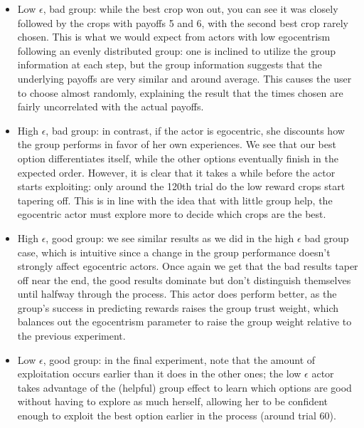 \documentclass[11pt, a4paper]{article}
\begin{document}
\begin{itemize}
	\item Low $\epsilon$, bad group: while the best crop won out, you can see it was closely followed by the crops with payoffs 5 and 6, with the second best crop rarely chosen. This is what we would expect from actors with low egocentrism following an evenly distributed group: one is inclined to utilize the group information at each step, but the group information suggests that the underlying payoffs are very similar and around average. This causes the user to choose almost randomly, explaining the result that the times chosen are fairly uncorrelated with the actual payoffs.

	\item High $\epsilon$, bad group: in contrast, if the actor is egocentric, she discounts how the group performs in favor of her own experiences. We see that our best option differentiates itself, while the other options eventually finish in the expected order. However, it is clear that it takes a while before the actor starts exploiting: only around the 120th trial do the low reward crops start tapering off. This is in line with the idea that with little group help, the egocentric actor must explore more to decide which crops are the best.

	\item High $\epsilon$, good group: we see similar results as we did in the high $\epsilon$ bad group case, which is intuitive since a change in the group performance doesn't strongly affect egocentric actors. Once again we get that the bad results taper off near the end, the good results dominate but don't distinguish themselves until halfway through the process. This actor does perform better, as the group's success in predicting rewards raises the group trust weight, which balances out the egocentrism parameter to raise the group weight relative to the previous experiment.

	\item Low $\epsilon$, good group: in the final experiment, note that the amount of exploitation occurs earlier than it does in the other ones; the low $\epsilon$ actor takes advantage of the (helpful) group effect to learn which options are good without having to explore as much herself, allowing her to be confident enough to exploit the best option earlier in the process (around trial 60). 
\end{itemize}
\end{document}
